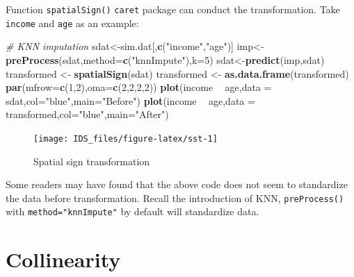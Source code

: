 \documentclass[12pt,]{krantz}
\newenvironment{Shaded}{\begin{snugshade}}{\end{snugshade}}
\newcommand{\KeywordTok}[1]{\textcolor[rgb]{0.13,0.29,0.53}{\textbf{#1}}}
\newcommand{\DataTypeTok}[1]{\textcolor[rgb]{0.13,0.29,0.53}{#1}}
\newcommand{\DecValTok}[1]{\textcolor[rgb]{0.00,0.00,0.81}{#1}}
\newcommand{\StringTok}[1]{\textcolor[rgb]{0.31,0.60,0.02}{#1}}
\newcommand{\CommentTok}[1]{\textcolor[rgb]{0.56,0.35,0.01}{\textit{#1}}}
\newcommand{\OperatorTok}[1]{\textcolor[rgb]{0.81,0.36,0.00}{\textbf{#1}}}
\newcommand{\NormalTok}[1]{#1}
\theoremstyle{definition}
\theoremstyle{definition}
\theoremstyle{definition}
\theoremstyle{remark}
\begin{document}
Function \texttt{spatialSign()} \texttt{caret} package can conduct the
transformation. Take \texttt{income} and \texttt{age} as an example:

\begin{Shaded}
\begin{Highlighting}[]
\CommentTok{# KNN imputation}
\NormalTok{sdat<-sim.dat[,}\KeywordTok{c}\NormalTok{(}\StringTok{"income"}\NormalTok{,}\StringTok{"age"}\NormalTok{)]}
\NormalTok{imp<-}\KeywordTok{preProcess}\NormalTok{(sdat,}\DataTypeTok{method=}\KeywordTok{c}\NormalTok{(}\StringTok{"knnImpute"}\NormalTok{),}\DataTypeTok{k=}\DecValTok{5}\NormalTok{)}
\NormalTok{sdat<-}\KeywordTok{predict}\NormalTok{(imp,sdat)}
\NormalTok{transformed <-}\StringTok{ }\KeywordTok{spatialSign}\NormalTok{(sdat)}
\NormalTok{transformed <-}\StringTok{ }\KeywordTok{as.data.frame}\NormalTok{(transformed)}
\KeywordTok{par}\NormalTok{(}\DataTypeTok{mfrow=}\KeywordTok{c}\NormalTok{(}\DecValTok{1}\NormalTok{,}\DecValTok{2}\NormalTok{),}\DataTypeTok{oma=}\KeywordTok{c}\NormalTok{(}\DecValTok{2}\NormalTok{,}\DecValTok{2}\NormalTok{,}\DecValTok{2}\NormalTok{,}\DecValTok{2}\NormalTok{))}
\KeywordTok{plot}\NormalTok{(income }\OperatorTok{~}\StringTok{ }\NormalTok{age,}\DataTypeTok{data =}\NormalTok{ sdat,}\DataTypeTok{col=}\StringTok{"blue"}\NormalTok{,}\DataTypeTok{main=}\StringTok{"Before"}\NormalTok{)}
\KeywordTok{plot}\NormalTok{(income }\OperatorTok{~}\StringTok{ }\NormalTok{age,}\DataTypeTok{data =}\NormalTok{ transformed,}\DataTypeTok{col=}\StringTok{"blue"}\NormalTok{,}\DataTypeTok{main=}\StringTok{"After"}\NormalTok{)}
\end{Highlighting}
\end{Shaded}

\begin{figure}

{\centering \texttt{[image: IDS\_files/figure-latex/sst-1]} 

}

\caption{Spatial sign transformation}\label{fig:sst}
\end{figure}

Some readers may have found that the above code does not seem to
standardize the data before transformation. Recall the introduction of
KNN, \texttt{preProcess()} with \texttt{method="knnImpute"} by default
will standardize data.

\section{Collinearity}\label{collinearity}
\end{document}
